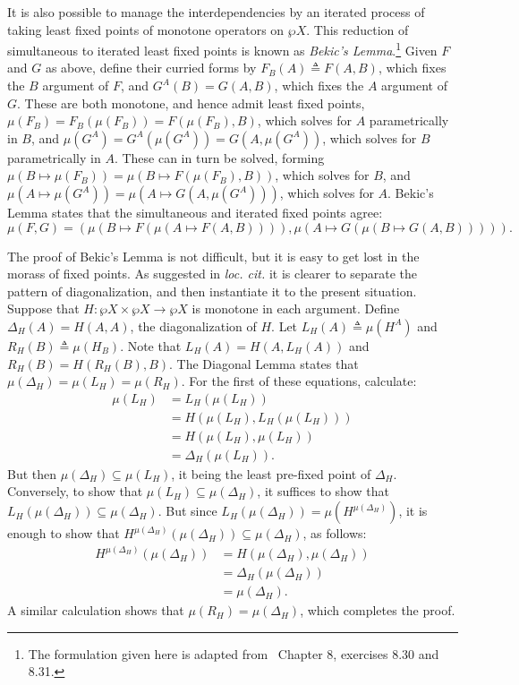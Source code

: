 \documentclass[11pt,twoside]{article}
\newcommand{\eqdef}{\mathrel{\triangleq}}
\begin{document}
It is also possible to manage the interdependencies by an iterated process of taking least
fixed points of monotone operators on $\wp{X}$.  This reduction of simultaneous to iterated
least fixed points is known as \emph{Bekic's Lemma}.\footnote{The formulation given here
  is adapted from~\citet{davey-priestley} Chapter 8, exercises 8.30 and 8.31.}  Given $F$
and $G$ as above, define their curried forms by $F_{B}(A)\eqdef{} F(A,B)$, which fixes the
$B$ argument of $F$, and $G^{A}(B)=G(A,B)$, which fixes the $A$ argument of $G$.  These
are both monotone, and hence admit least fixed points,
$\mu(F_{B})=F_{B}(\mu(F_{B}))=F(\mu(F_{B}),B)$, which solves for $A$ parametrically in
$B$, and $\mu(G^{A})=G^{A}(\mu(G^{A}))=G(A,\mu(G^{A}))$, which solves for $B$ parametrically in
$A$.  These can in turn be solved, forming
$\mu(B\mapsto \mu(F_{B}))=\mu(B\mapsto F(\mu(F_{B}),B))$, which solves for $B$, and
$\mu(A\mapsto \mu(G^{A}))=\mu(A\mapsto G(A,\mu(G^{A})))$, which solves for $A$.  Bekic's Lemma states that the
simultaneous and iterated fixed points agree:
$$\mu(F,G) = (\mu(B\mapsto F(\mu(A\mapsto F(A,B)))),\mu(A\mapsto G(\mu(B\mapsto G(A,B))))).$$

The proof of Bekic's Lemma is not difficult, but it is easy to get lost in the morass of
fixed points.  As suggested in \textit{loc. cit.} it is clearer to separate the pattern of
diagonalization, and then instantiate it to the present situation.  Suppose that
$H:\wp{X}\times\wp{X}\to\wp{X}$ is monotone in each argument.  Define
$\Delta_{H}(A)=H(A,A)$, the diagonalization of $H$.  Let $L_{H}(A) \eqdef{} \mu(H^{A})$ and
$R_{H}(B) \eqdef{} \mu(H_{B})$.  Note that $L_{H}(A)=H(A,L_{H}(A))$ and
$R_{H}(B) = H(R_{H}(B),B)$.  The Diagonal Lemma states that
$\mu(\Delta_{H})=\mu(L_{H})=\mu(R_{H})$.  For the first of these equations, calculate:
\begin{align*}
  \mu(L_{H}) & = L_{H}(\mu(L_{H})) \\
           & = H(\mu(L_{H}),L_{H}(\mu(L_{H}))) \\
           & = H(\mu(L_{H}),\mu(L_{H})) \\
           & = \Delta_{H}(\mu(L_{H})).
\end{align*}
But then $\mu(\Delta_{H})\subseteq\mu(L_{H})$, it being the least pre-fixed point of
$\Delta_{H}$.  Conversely, to show that $\mu(L_{H})\subseteq\mu(\Delta_{H})$, it suffices to show that
$L_{H}(\mu(\Delta_{H}))\subseteq\mu(\Delta_{H})$.  But since $L_{H}(\mu(\Delta_{H}))=\mu(H^{\mu(\Delta_{H})})$, it is enough to
show that $H^{\mu(\Delta_{H})}(\mu(\Delta_{H}))\subseteq\mu(\Delta_{H})$, as follows:
\begin{align*}
  H^{\mu(\Delta_{H})}(\mu(\Delta_{H}))
  & = H(\mu(\Delta_{H}),\mu(\Delta_{H})) \\
  & = \Delta_{H}(\mu(\Delta_{H})) \\
  & = \mu(\Delta_{H}).
\end{align*}
A similar calculation shows that $\mu(R_{H})=\mu(\Delta_{H})$, which completes the proof.
\end{document}
